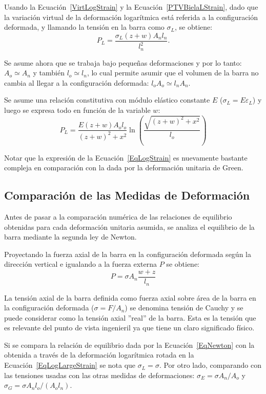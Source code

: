 Usando la Ecuación~\eqref{VirtLogStrain} y la Ecuación~\eqref{PTVBielaLStrain}, dado que la variación virtual de la deformación logarítmica está referida a la configuración deformada, y llamando la tensión en la barra como $\sigma_L$, se obtiene:
%
\begin{equation}\label{EqLogLargeStrain}
P_L = \frac{\sigma_L(z+w)A_nl_n}{l_n^2}.
\end{equation}

Se asume ahora que se trabaja bajo pequeñas deformaciones y por lo tanto: $A_o \simeq A_n$ y también $l_o \simeq l_n$, lo cual permite asumir que el volumen de la barra no cambia al llegar a la configuración deformada: $l_o A_o \simeq l_n A_n$. 

Se asume una relación constitutiva con módulo elástico constante $E$ ($\sigma_L = E \varepsilon_L$) y luego se expresa todo en función de la variable $w$:
%
\begin{equation}\label{EqLogStrain}
P_L = \frac{E(z+w)A_ol_o}{(z+w)^2+x^2}\ln\left(\frac{\sqrt{(z+w)^2+x^2}}{l_o}\right)
\end{equation}

Notar que la expresión de la Ecuación~\eqref{EqLogStrain} es nuevamente bastante compleja en comparación con la dada por la deformación unitaria de Green.

\subsection{Comparación de las Medidas de Deformación}

Antes de pasar a la comparación numérica de las relaciones de equilibrio obtenidas para cada deformación unitaria asumida, se analiza el equilibrio de la barra mediante la segunda ley de Newton.

Proyectando la fuerza axial de la barra en la configuración deformada según la dirección vertical e igualando a la fuerza externa $P$ se obtiene:
%
\begin{equation}\label{EqNewton}
P = \sigma A_n \frac{w+z}{l_n}
\end{equation}

La tensión axial de la barra definida como fuerza axial sobre área de la barra en la configuración deformada ($\sigma = F / A_n$) se denomina tensión de Cauchy y se puede considerar como la tensión axial ''real'' de la barra. Esta es la tensión que es relevante del punto de vista ingenieril ya que tiene un claro significado físico.

Si se compara la relación de equilibrio dada por la Ecuación~\eqref{EqNewton} con la obtenida a través de la deformación logarítmica rotada en la Ecuación~\eqref{EqLogLargeStrain} se nota que $\sigma_L=\sigma$. %
%
Por otro lado, comparando con las tensiones usadas con las otras medidas de deformaciones: $\sigma_E = \sigma A_n / A_o$ y $\sigma_G = \sigma A_nl_o/(A_ol_n)$.

